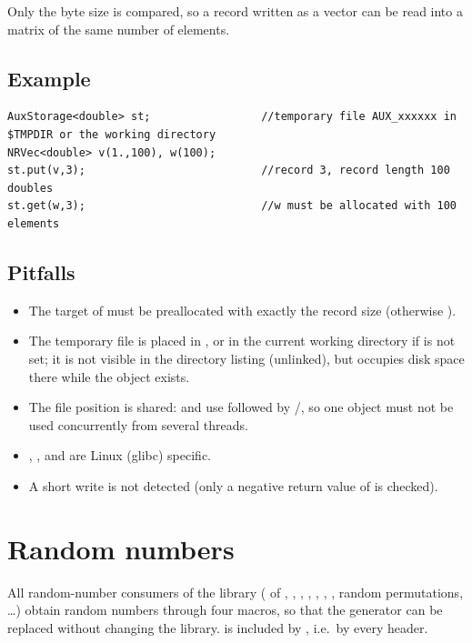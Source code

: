 Only the byte size is compared, so a record written as a vector can be read into a matrix of the same number of elements.

\subsection{Example}
\begin{lstlisting}
AuxStorage<double> st;                 //temporary file AUX_xxxxxx in $TMPDIR or the working directory
NRVec<double> v(1.,100), w(100);
st.put(v,3);                           //record 3, record length 100 doubles
st.get(w,3);                           //w must be allocated with 100 elements
\end{lstlisting}

\subsection{Pitfalls}
\begin{itemize}
\item The target of  must be preallocated with exactly the record size (otherwise ).
\item The temporary file is placed in , or in the current working directory if  is not set; it is
not visible in the directory listing (unlinked), but occupies disk space there while the object exists.
\item The file position is shared:  and  use  followed by /, so
one object must not be used concurrently from several threads.
\item {}, ,  and  are Linux (glibc) specific.
\item A short write is not detected (only a negative return value of  is checked).
\end{itemize}

\section{Random numbers}\label{sec:utilities:random}

All random-number consumers of the library ( of , , , ,
, , , random permutations, \dots) obtain random numbers through four macros,
so that the generator can be replaced without changing the library.  is included by
, i.e.\ by every \LA{} header.

